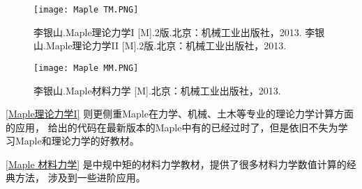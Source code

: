 \begin{large}
\begin{spacing}{1.5}
        \begin{figure}[htbp]
            \centering
            \begin{minipage}[t]
                {0.45\textwidth}
                \centering
                \texttt{[image: Maple TM.PNG]}
                \caption{李银山.Maple理论力学I [M].2版.北京：机械工业出版社，2013.
                李银山.Maple理论力学II [M].2版.北京：机械工业出版社，2013.
                }

                \label{Maple理论力学I}
            \end{minipage}
            \quad
            \begin{minipage}[t]
                {0.45\textwidth}
                \centering
                \texttt{[image: Maple MM.PNG]}
                \caption{李银山.Maple材料力学 [M].北京：机械工业出版社，2013.}
                \label{Maple 材料力学}
            \end{minipage}

        \end{figure}
        \autoref{Maple理论力学I} \cite[Maple 理论力学 I]{李银山2013maple} 则更侧重Maple在力学、机械、土木等专业的理论力学计算方面的应用，
        给出的代码在最新版本的Maple中有的已经过时了，但是依旧不失为学
        习Maple和理论力学的好教材。

        \autoref{Maple 材料力学} \cite[Maple 材料力学]{李银山2013maple2} 是中规中矩的材料力学教材，提供了很多材料力学数值计算的经典方法，
        涉及到一些进阶应用。
    \end{spacing}
\end{large}


\restoregeometry